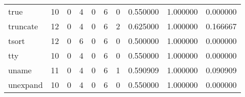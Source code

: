 \begin{longtable}{lrrrrrrrrr}
true      &                                       10 &                                                  0 &                                                  4 &                                                  0 &                                                  6 &                                                  0 &                                           0.550000 &                               1.000000 &                             0.000000 \\
truncate  &                                       12 &                                                  0 &                                                  4 &                                                  0 &                                                  6 &                                                  2 &                                           0.625000 &                               1.000000 &                             0.166667 \\
tsort     &                                       12 &                                                  0 &                                                  6 &                                                  0 &                                                  6 &                                                  0 &                                           0.500000 &                               1.000000 &                             0.000000 \\
tty       &                                       10 &                                                  0 &                                                  4 &                                                  0 &                                                  6 &                                                  0 &                                           0.550000 &                               1.000000 &                             0.000000 \\
uname     &                                       11 &                                                  0 &                                                  4 &                                                  0 &                                                  6 &                                                  1 &                                           0.590909 &                               1.000000 &                             0.090909 \\
unexpand  &                                       10 &                                                  0 &                                                  4 &                                                  0 &                                                  6 &                                                  0 &                                           0.550000 &                               1.000000 &                             0.000000 \\

\end{longtable}
